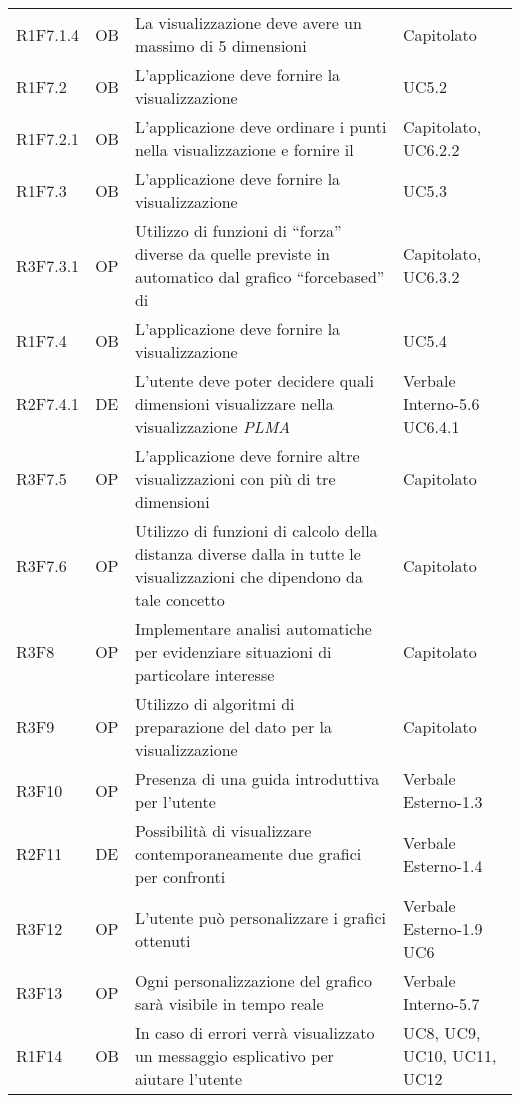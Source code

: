 {\begin{longtable}{C{2cm} | C{1.5cm} | C{9cm} | C{3.3cm}}
R1F7.1.4 & OB & La visualizzazione  deve avere un massimo di 5 dimensioni & Capitolato\\

R1F7.2 & OB & L'applicazione deve fornire la visualizzazione  & UC5.2\\
R1F7.2.1 & OB & L'applicazione deve ordinare i punti nella visualizzazione  e fornire il  & Capitolato, UC6.2.2 \\
R1F7.3 & OB & L'applicazione deve fornire la visualizzazione  & UC5.3\\
R3F7.3.1 & OP & Utilizzo di funzioni di “forza” diverse da quelle previste in automatico dal grafico “forcebased” di  & Capitolato, UC6.3.2\\
R1F7.4 & OB & L'applicazione deve fornire la visualizzazione  & UC5.4 \\
R2F7.4.1 & DE & L'utente deve poter decidere quali dimensioni visualizzare nella visualizzazione \textit{PLMA} & Verbale Interno-5.6 \newline UC6.4.1\\
R3F7.5 & OP & L'applicazione deve fornire altre visualizzazioni con più di tre dimensioni & Capitolato\\
R3F7.6 & OP & Utilizzo di funzioni di calcolo della distanza diverse dalla  in tutte le visualizzazioni che dipendono da tale concetto & Capitolato \\
R3F8 & OP & Implementare analisi automatiche per evidenziare situazioni di particolare interesse & Capitolato\\
R3F9 & OP & Utilizzo di algoritmi di preparazione del dato per la visualizzazione & Capitolato\\
R3F10 & OP & Presenza di una guida introduttiva per l'utente & Verbale Esterno-1.3\\
R2F11 & DE & Possibilità di visualizzare contemporaneamente due grafici per confronti & Verbale Esterno-1.4\\
R3F12 & OP & L'utente può personalizzare i grafici ottenuti & Verbale Esterno-1.9 \newline UC6 \\
R3F13 & OP & Ogni personalizzazione del grafico sarà visibile in tempo reale & Verbale Interno-5.7 \\
R1F14 & OB & In caso di errori verrà visualizzato un messaggio esplicativo per aiutare l'utente & UC8, UC9, UC10, UC11, UC12\\

\end{longtable}}
